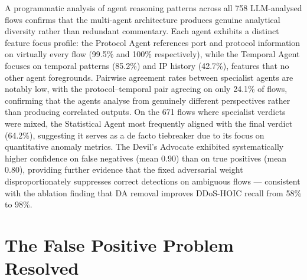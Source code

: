 \documentclass[../main.tex]{subfiles}
\begin{document}
A programmatic analysis of agent reasoning patterns across all 758 LLM-analysed flows confirms that the multi-agent architecture produces genuine analytical diversity rather than redundant commentary. Each agent exhibits a distinct feature focus profile: the Protocol Agent references port and protocol information on virtually every flow (99.5\% and 100\% respectively), while the Temporal Agent focuses on temporal patterns (85.2\%) and IP history (42.7\%), features that no other agent foregrounds. Pairwise agreement rates between specialist agents are notably low, with the protocol--temporal pair agreeing on only 24.1\% of flows, confirming that the agents analyse from genuinely different perspectives rather than producing correlated outputs. On the 671 flows where specialist verdicts were mixed, the Statistical Agent most frequently aligned with the final verdict (64.2\%), suggesting it serves as a de facto tiebreaker due to its focus on quantitative anomaly metrics. The Devil's Advocate exhibited systematically higher confidence on false negatives (mean 0.90) than on true positives (mean 0.80), providing further evidence that the fixed adversarial weight disproportionately suppresses correct detections on ambiguous flows --- consistent with the ablation finding that DA removal improves DDoS-HOIC recall from 58\% to 98\%.

\section{The False Positive Problem Resolved}
\end{document}
